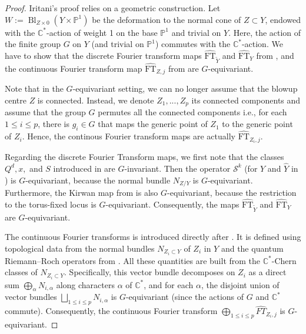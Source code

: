 \documentclass{amsart}
\theoremstyle{definition}
\theoremstyle{remark}
\newcommand{\CC}{\mathbb C}
\newcommand{\PP}{\mathbb P}
\newcommand{\Bl}{\operatorname{Bl}}
\begin{document}
\begin{proof}
Iritani's proof relies on a geometric construction. Let $W:=\Bl_{Z\times 0}(Y\times \PP^1)$ be the deformation to the normal cone of \(Z\subset Y\), endowed with the \(\CC^*\)-action of weight 1 on the base \(\PP^1\) and trivial on \(Y\). Here, the action of the finite group $G$ on $Y$ (and trivial on $\PP^1$) commutes with the $\CC^*$-action. We have to show that the discrete Fourier transform maps $\widehat{\mathrm{FT}}_{\widetilde Y}$ and $\widehat{\mathrm{FT}}_{Y}$ from \cite[\S4.1]{Iritani2023QuantumCO}, and the continuous Fourier transform map $\widehat{\mathrm{FT}}_{Z,j}$ from \cite[\S4.2]{Iritani2023QuantumCO} are \(G\)-equivariant.

Note that in the $G$-equivariant setting, we can no longer assume that the blowup centre $Z$ is connected. Instead, we denote $Z_1,..., Z_p$ its connected components and assume that the group $G$ permutes all the connected components i.e., for each $1\le i\le p$, there is $g_i\in G$ that maps the generic point of $Z_1$ to the generic point of $Z_i$. Hence, the continous Fourier transform maps are actually $\widehat{\mathrm{FT}}_{Z_i,j}$.

Regarding the discrete Fourier Transform maps, we first note that the classes $Q^d, x,$ and $S$ introduced in \cite[Table~2]{Iritani2023QuantumCO} are \(G\)-invariant. Then the operator 
\(\mathcal{S}^k\) (for $Y$ and $\widehat Y$ in 
\cite[Equation~(3.8)]{Iritani2023QuantumCO}) is $G$-equivariant, because the normal bundle
\(N_{Z/Y}\) is \(G\)-equivariant. Furthermore, the Kirwan map from \cite[Section~3.6]{Iritani2023QuantumCO} is also \(G\)-equivariant, because the restriction to the torus-fixed locus is \(G\)-equivariant. Consequently, the maps $\widehat{\mathrm{FT}}_{\widetilde Y}$ and $\widehat{\mathrm{FT}}_{Y}$ are \(G\)-equivariant. 

The continuous Fourier transforms is introduced directly after
\cite[Equation~(4.9)]{Iritani2023QuantumCO}. It is defined using topological data from the normal bundles
\(N_{Z_i\subset Y}\) of $Z_i$ in $Y$ and the quantum Riemann--Roch operators from
\cite[Equation~(2.24)]{Iritani2023QuantumCO}. All these quantities are built from the
\(\CC^*\)-Chern classes of \(N_{Z_i\subset Y}\). Specifically, this vector bundle decomposes on $Z_i$ as a direct sum $\bigoplus_{\alpha} N_{i, \alpha}$ along characters $\alpha$ of $\mathbb{C}^*$, and for each $\alpha$, the disjoint union of vector bundles $\bigsqcup_{1\le i \le p}N_{i,\alpha}$ is $G$-equivariant (since the actions of $G$ and $\mathbb{C}^*$ commute). Consequently, the continuous Fourier transform $\bigoplus_{1\le i\le p}\widehat{FT}_{Z_i, j}$ is $G$-equivariant.
\end{proof}
\end{document}
